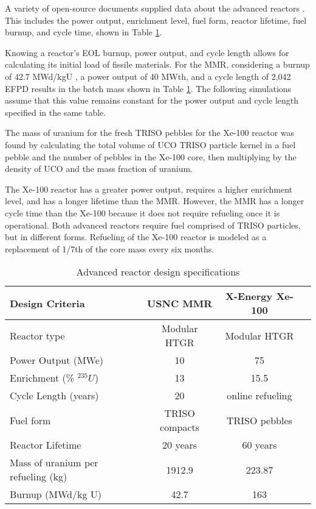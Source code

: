 A variety of open-source documents supplied data about the advanced reactors
\cite{mitchell_usnc_2020, hawari_development_2018, venneri_neutronic_2015, 
harlan_x-energy_2018, hussain_advances_2018}. 
This includes 
the power output, enrichment level, fuel form, reactor lifetime, fuel 
burnup, and cycle time, shown in Table \ref{tab:reactor_summary}. 

Knowing a reactor's \gls{EOL} burnup, power output, and cycle length
allows for calculating its initial load of fissile materials.
For the \gls{MMR}, considering a burnup of 42.7 MWd/kgU 
\cite{hawari_development_2018},
a power output of 40 MWth, and a cycle length of 2,042 \gls{EFPD} 
\cite{venneri_neutronic_2015}
results in the batch mass shown in Table \ref{tab:reactor_summary}.
The following simulations assume that this value remains constant for the
power output and cycle length specified in the same table.

The mass of uranium for the fresh \gls{TRISO} pebbles for the Xe-100 
reactor was found by calculating the total volume of UCO \gls{TRISO} 
particle kernel in a fuel pebble and the number of 
pebbles in the Xe-100 core\cite{harlan_x-energy_2018}, then 
multiplying by the density of UCO and the mass fraction of uranium. 

The Xe-100 reactor has a greater power output, requires a higher enrichment 
level, and has a longer lifetime than the \gls{MMR}. However, the 
\gls{MMR} has a longer cycle time than the Xe-100 because it does not require 
refueling once it is operational. Both advanced reactors require fuel 
comprised of \gls{TRISO} particles, but in different forms. Refueling 
of the Xe-100 reactor is modeled as a replacement of 1/7th of the core mass 
every six months.  

\begin{table}[ht]
        \caption{Advanced reactor design specifications}
        \label{tab:reactor_summary}
        \begin{tabular}{l c c c }
            \hline
            Design Criteria & \gls{USNC} \gls{MMR} \cite{mitchell_usnc_2020}& 
                X-Energy Xe-100 \cite{harlan_x-energy_2018,hussain_advances_2018} \\\hline
            Reactor type & Modular HTGR & Modular HTGR \\
            Power Output (MWe) & 10 & 75 \\
            Enrichment (\% $^{235}U$) & 13 & 15.5 \\
            Cycle Length (years) & 20 & online refueling\\
            Fuel form & \gls{TRISO} compacts & \gls{TRISO} pebbles\\
            Reactor Lifetime & 20 years & 60 years \\
            Mass of uranium per refueling (kg) & 1912.9 & 223.87 \\
            Burnup (MWd/kg U) & 42.7 & 163 \\
            \hline
        \end{tabular}
    \end{table}

